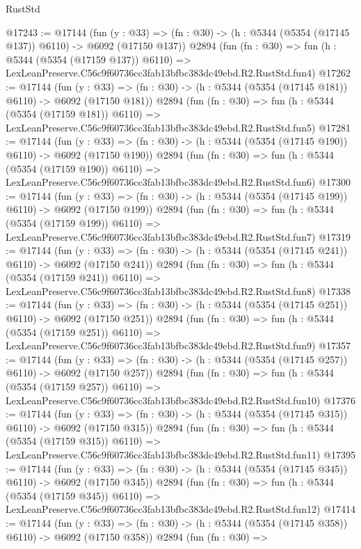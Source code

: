 \begin{lexlean}{RustStd}
\begin{coremodule}
@17243 := @17144
    (fun (y : @33) => (fn : @30) -> (h : @5344 (@5354 (@17145 @137)) @6110) -> @6092 (@17150 @137))
    @2894
    (fun (fn : @30) =>
    fun (h : @5344 (@5354 (@17159 @137)) @6110) =>
    LexLeanPreserve.C56c9f60736cc3fab13bfbc383dc49ebd.R2.RustStd.fun4)
@17262 := @17144
    (fun (y : @33) => (fn : @30) -> (h : @5344 (@5354 (@17145 @181)) @6110) -> @6092 (@17150 @181))
    @2894
    (fun (fn : @30) =>
    fun (h : @5344 (@5354 (@17159 @181)) @6110) =>
    LexLeanPreserve.C56c9f60736cc3fab13bfbc383dc49ebd.R2.RustStd.fun5)
@17281 := @17144
    (fun (y : @33) => (fn : @30) -> (h : @5344 (@5354 (@17145 @190)) @6110) -> @6092 (@17150 @190))
    @2894
    (fun (fn : @30) =>
    fun (h : @5344 (@5354 (@17159 @190)) @6110) =>
    LexLeanPreserve.C56c9f60736cc3fab13bfbc383dc49ebd.R2.RustStd.fun6)
@17300 := @17144
    (fun (y : @33) => (fn : @30) -> (h : @5344 (@5354 (@17145 @199)) @6110) -> @6092 (@17150 @199))
    @2894
    (fun (fn : @30) =>
    fun (h : @5344 (@5354 (@17159 @199)) @6110) =>
    LexLeanPreserve.C56c9f60736cc3fab13bfbc383dc49ebd.R2.RustStd.fun7)
@17319 := @17144
    (fun (y : @33) => (fn : @30) -> (h : @5344 (@5354 (@17145 @241)) @6110) -> @6092 (@17150 @241))
    @2894
    (fun (fn : @30) =>
    fun (h : @5344 (@5354 (@17159 @241)) @6110) =>
    LexLeanPreserve.C56c9f60736cc3fab13bfbc383dc49ebd.R2.RustStd.fun8)
@17338 := @17144
    (fun (y : @33) => (fn : @30) -> (h : @5344 (@5354 (@17145 @251)) @6110) -> @6092 (@17150 @251))
    @2894
    (fun (fn : @30) =>
    fun (h : @5344 (@5354 (@17159 @251)) @6110) =>
    LexLeanPreserve.C56c9f60736cc3fab13bfbc383dc49ebd.R2.RustStd.fun9)
@17357 := @17144
    (fun (y : @33) => (fn : @30) -> (h : @5344 (@5354 (@17145 @257)) @6110) -> @6092 (@17150 @257))
    @2894
    (fun (fn : @30) =>
    fun (h : @5344 (@5354 (@17159 @257)) @6110) =>
    LexLeanPreserve.C56c9f60736cc3fab13bfbc383dc49ebd.R2.RustStd.fun10)
@17376 := @17144
    (fun (y : @33) => (fn : @30) -> (h : @5344 (@5354 (@17145 @315)) @6110) -> @6092 (@17150 @315))
    @2894
    (fun (fn : @30) =>
    fun (h : @5344 (@5354 (@17159 @315)) @6110) =>
    LexLeanPreserve.C56c9f60736cc3fab13bfbc383dc49ebd.R2.RustStd.fun11)
@17395 := @17144
    (fun (y : @33) => (fn : @30) -> (h : @5344 (@5354 (@17145 @345)) @6110) -> @6092 (@17150 @345))
    @2894
    (fun (fn : @30) =>
    fun (h : @5344 (@5354 (@17159 @345)) @6110) =>
    LexLeanPreserve.C56c9f60736cc3fab13bfbc383dc49ebd.R2.RustStd.fun12)
@17414 := @17144
    (fun (y : @33) => (fn : @30) -> (h : @5344 (@5354 (@17145 @358)) @6110) -> @6092 (@17150 @358))
    @2894
    (fun (fn : @30) =>

\end{coremodule}
\end{lexlean}
